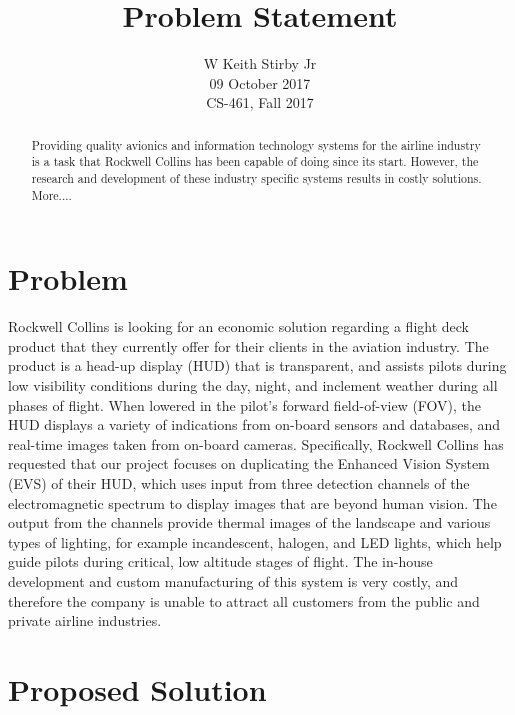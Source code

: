 \documentclass[letterpaper,10pt,serif,draftclsnofoot,onecolumn,compsoc,titlepage]{IEEEtran}
\title{Problem Statement}
\author{W Keith Stirby Jr \\ 09 October 2017 \\ CS-461, Fall 2017}
\begin{document}
\maketitle
\begin{abstract}

Providing quality avionics and information technology systems for the airline industry 
is a task that Rockwell Collins has been capable of doing since its start. However, 
the research and development of these industry specific systems results in costly 
solutions. More....\\

\end{abstract}

\section{Problem}

Rockwell Collins is looking for an economic solution regarding a flight deck product 
that they currently offer for their clients in the aviation industry. The product is 
a head-up display (HUD) that is transparent, and assists pilots during low visibility 
conditions during the day, night, and inclement weather during all phases of flight. 
When lowered in the pilot’s forward field-of-view (FOV), the HUD displays a variety 
of indications from on-board sensors and databases, and real-time images taken from 
on-board cameras. Specifically, Rockwell Collins has requested that our project focuses
 on duplicating the Enhanced Vision System (EVS) of their HUD, which uses input from 
 three detection channels of the electromagnetic spectrum to display images that are 
 beyond human vision. The output from the channels provide thermal images of the 
 landscape and various types of lighting, for example incandescent, halogen, and LED 
 lights, which help guide pilots during critical, low altitude stages of flight. The 
 in-house development and custom manufacturing of this system is very costly, and 
 therefore the company is unable to attract all customers from the public and private 
 airline industries.\\
 
\section{Proposed Solution}
\end{document}
